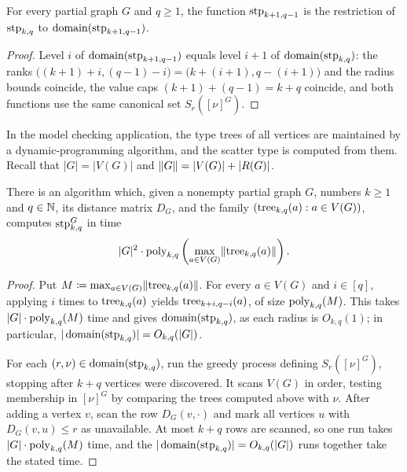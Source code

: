\begin{lemma}\label{obs:stp-restrict}
For every partial graph $G$ and $q\ge 1$, the function $\textnormal{stp}_{k+1,q-1}$ is the restriction of $\textnormal{stp}_{k,q}$ to $\operatorname{domain}(\textnormal{stp}_{k+1,q-1})$.
\end{lemma}
\begin{proof}
Level $i$ of $\operatorname{domain}(\textnormal{stp}_{k+1,q-1})$ equals level $i+1$ of $\operatorname{domain}(\textnormal{stp}_{k,q})$: the ranks $\bigl((k+1)+i,(q-1)-i\bigr)=\bigl(k+(i+1),q-(i+1)\bigr)$ and the radius bounds coincide, the value caps $(k+1)+(q-1)=k+q$ coincide, and both functions use the same canonical set $S_r([\nu]^G)$.
\end{proof}


In the model checking application, the type trees of all vertices are maintained by a dynamic-programming algorithm, and the scatter type is computed from them.
Recall that $|G|=|V(G)|$ and $\lVert G\rVert=|V(G)|+|R(G)|$.

\begin{lemma}\label{lem:compute-stp}
There is an algorithm which, given a nonempty partial graph $G$, numbers
$k\ge1$ and $q\in\mathbb N$, its distance matrix $D_G$, and the family
$(\mathrm{tree}_{k,q}(a):a\in V(G))$, computes $\textnormal{stp}^G_{k,q}$ in time
\[
|G|^2\cdot
\mathrm{poly}_{k,q}\left(\max_{a\in V(G)}\lVert \mathrm{tree}_{k,q}(a)\rVert\right).
\]
\end{lemma}
\begin{proof}
Put $M\coloneqq\max_{a\in V(G)}\lVert \mathrm{tree}_{k,q}(a)\rVert$.
For every $a\in V(G)$ and $i\in[q]$, applying  $i$ times to $\mathrm{tree}_{k,q}(a)$ yields $\mathrm{tree}_{k+i,q-i}(a)$, of size $\mathrm{poly}_{k,q}(M)$.
This takes $|G|\cdot\mathrm{poly}_{k,q}(M)$ time and gives $\operatorname{domain}(\textnormal{stp}_{k,q})$, as each radius is $O_{k,q}(1)$; in particular, $|\operatorname{domain}(\textnormal{stp}_{k,q})|=O_{k,q}(|G|)$.


For each $(r,\nu)\in \operatorname{domain}(\textnormal{stp}_{k,q})$, run the greedy process defining $S_r([\nu]^G)$, stopping after $k+q$ vertices were discovered.
It scans $V(G)$ in order, testing membership in $[\nu]^G$ by comparing the trees computed above with $\nu$. After adding a vertex $v$, scan the row $D_G(v,\cdot)$ and mark all vertices $u$ with $D_G(v,u)\le r$ as unavailable.
At most $k+q$ rows are scanned, so one run takes $|G|\cdot\mathrm{poly}_{k,q}(M)$ time, and the $|\operatorname{domain}(\textnormal{stp}_{k,q})|=O_{k,q}(|G|)$ runs together take the stated time.
\end{proof}


